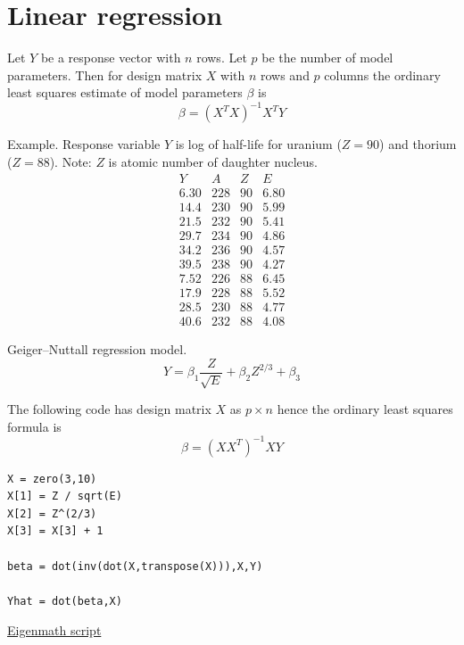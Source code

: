 
\newpage

\section{Linear regression}

Let $Y$ be a response vector with $n$ rows.
Let $p$ be the number of model parameters.
Then for design matrix $X$ with $n$ rows and $p$ columns the ordinary least squares
estimate of model parameters $\beta$ is
\begin{equation*}
\beta=(X^TX)^{-1}X^TY
\end{equation*}

Example.
Response variable $Y$ is log of half-life for uranium ($Z=90$)
and thorium ($Z=88$).
Note: $Z$ is atomic number of daughter nucleus.
\begin{equation*}
\begin{matrix}
Y & A & Z & E
\\[1ex]
6.30 & 228 & 90 & 6.80
\\
14.4 & 230 & 90 & 5.99
\\
21.5 & 232 & 90 & 5.41
\\
29.7 & 234 & 90 & 4.86
\\
34.2 & 236 & 90 & 4.57
\\
39.5 & 238 & 90 & 4.27
\\
7.52 & 226 & 88 & 6.45
\\
17.9 & 228 & 88 & 5.52
\\
28.5 & 230 & 88 & 4.77
\\
40.6 & 232 & 88 & 4.08
\end{matrix}
\end{equation*}

Geiger–Nuttall regression model.
\begin{equation*}
\hat Y=\beta_1\frac{Z}{\sqrt E}+\beta_2Z^{2/3}+\beta_3
\end{equation*}

The following code has design matrix $X$
as $p\times n$ hence the ordinary least squares formula is
\begin{equation*}
\beta=(XX^T)^{-1}XY
\end{equation*}

{\color{blue}
\begin{verbatim}
X = zero(3,10)
X[1] = Z / sqrt(E)
X[2] = Z^(2/3)
X[3] = X[3] + 1

beta = dot(inv(dot(X,transpose(X))),X,Y)

Yhat = dot(beta,X)
\end{verbatim}}

\href{https://georgeweigt.github.io/examples/linear-regression-demo.html}{Eigenmath script}


